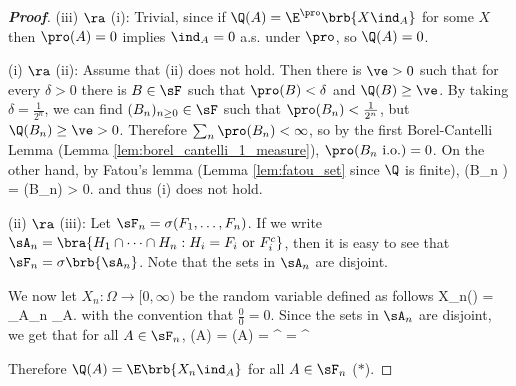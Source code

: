\begin{proof}[\bf Proof]
(iii) $\ra$ (i): Trivial, since if $\Q(A) = \E^\pro\brb{X\ind_A}$ for some $X$ then $\pro(A) = 0$ implies $\ind_A = 0$ a.s. under $\pro$, so $\Q(A) = 0$.

(i) $\ra$ (ii): Assume that (ii) does not hold. Then there is $\ve > 0$ such that for every $\delta > 0$ there is $B \in \sF$ such that $\pro(B) < \delta$ and $\Q(B) \geq \ve$. By taking $\delta = \frac 1{2^n}$, we can find $(B_n)_{n \geq 0}\in \sF$ such that $\pro(B_n) < \frac 1{2^n}$, but $\Q(B_n) \geq \ve > 0$. Therefore $\sum_n \pro(B_n) < \infty$, so by the first Borel-Cantelli Lemma (Lemma \ref{lem:borel_cantelli_1_measure}), $\pro(B_n \text{ i.o.}) = 0$. On the other hand, by Fatou's lemma (Lemma \ref{lem:fatou_set} since $\Q$ is finite),
\be
\Q(B_n ) = \Q{} \geq \limsup \Q(B_n) \geq \ve > 0.%
\ee
and thus (i) does not hold.


(ii) $\ra$ (iii): Let $\sF_n = \sigma(F_1, \dots, F_n)$. If we write $\sA_n = \bra{H_1\cap \dots \cap H_n:H_i = F_i \text{ or }F_i^c}$, then it is easy to see that $\sF_n = \sigma\brb{\sA_n}$. Note that the sets in $\sA_n$ are disjoint.


We now let $X_n:\Omega \to [0,\infty)$ be the random variable defined as follows
\be
X_n(\omega) = \sum_{A\in \sA_n} \ind_A.
\ee
with the convention that $\frac 00 = 0$. Since the sets in $\sA_n$ are disjoint, we get that for all $A\in \sF_n$,
\be
\Q(A) =  \pro(A) = \E^\pro{} = \E^\pro{}
\ee


Therefore $\Q(A) = \E\brb{X_n\ind_A}$ for all $A\in \sF_n$ ($*$).%


\end{proof}
